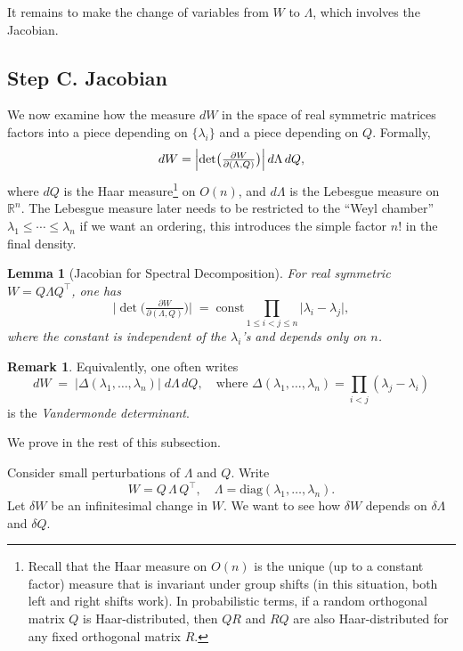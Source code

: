 \documentclass[letterpaper,11pt,oneside,reqno]{book}
\numberwithin{equation}{chapter}  %
\newtheorem{lemma}[proposition]{Lemma}
\theoremstyle{definition}
\newtheorem{remark}[proposition]{Remark}
\begin{document}
It remains to make the change of variables from \(W\) to \(\Lambda\), which involves the Jacobian.

\subsection{Step C. Jacobian}
\label{lecture3:subsec:jacobian}

We now examine how the measure \(dW\) in the space of real symmetric matrices factors into a piece depending on \(\{\lambda_i\}\) and a piece depending on \(Q\).  Formally,
\[
  dW
  = \Bigl|\det\bigl(\tfrac{\partial W}{\partial(\Lambda,Q)}\bigr)\Bigr|
    \,d\Lambda\,dQ,
\]
where \(dQ\) is the Haar measure\footnote{Recall that the
	Haar measure on \(O(n)\) is the unique
	(up to a constant factor) measure that is invariant under
	group shifts (in this situation, both left and right shifts
	work). In probabilistic terms,
	if a random orthogonal matrix $Q$ is Haar-distributed,
	then $QR$ and $RQ$ are also Haar-distributed for any fixed orthogonal
matrix $R$.}
on \(O(n)\), and
\(d\Lambda\) is the Lebesgue measure on \(\mathbb{R}^n\).
The Lebesgue measure later needs to be restricted
to the ``Weyl chamber''
\(\lambda_1\le \cdots\le \lambda_n\) if we want an ordering,
this introduces the simple factor \(n!\) in the final density.


\begin{lemma}[Jacobian for Spectral Decomposition]
\label{lecture3:lemma:Jacobian-GOE}
For real symmetric \(W=Q\Lambda Q^\top\), one has
\[
  \bigl|\det\bigl(\tfrac{\partial W}{\partial(\Lambda,Q)}\bigr)\bigr|
  \;=\;
	\mathrm{const}
  \prod_{1\le i<j\le n}
	\!\!
	\bigl|\lambda_i - \lambda_j\bigr|,
\]
where the constant is independent of the \(\lambda_i\)'s and
depends only on \(n\).
\end{lemma}

\begin{remark}
Equivalently, one often writes
\[
  dW
  \;=\;
  \bigl|\Delta(\lambda_1,\dots,\lambda_n)\bigr|\;
  d\Lambda\,dQ,
  \quad\text{where }
  \Delta(\lambda_1,\dots,\lambda_n)
  = \prod_{i<j}(\lambda_j-\lambda_i)
\]
is the \emph{Vandermonde determinant}.
\end{remark}

We prove  in the rest of this subsection.
\medskip

Consider small perturbations of \(\Lambda\) and \(Q\).  Write
\[
  W = Q\,\Lambda\,Q^\top,
  \quad
  \Lambda = \mathrm{diag}(\lambda_1,\dots,\lambda_n).
\]
Let \(\delta W\) be an infinitesimal change in \(W\). We want to see how \(\delta W\) depends on \(\delta\Lambda\) and \(\delta Q\).
\end{document}
